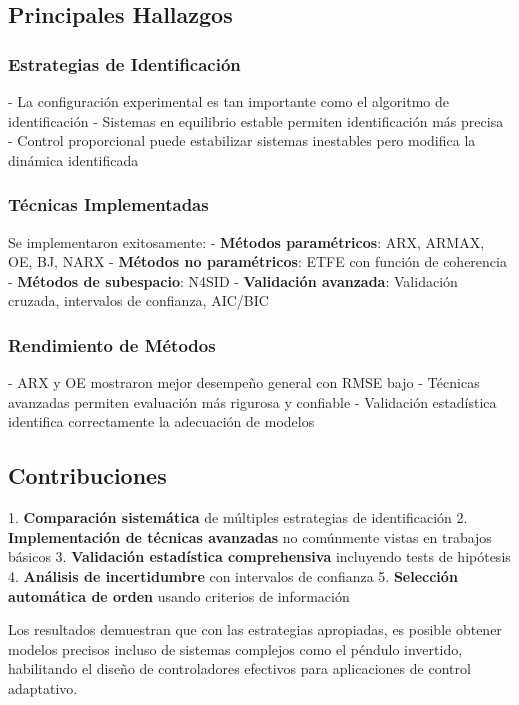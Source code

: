 \documentclass[a4paper,openright,9pt]{report}
\begin{document}
\subsection{Principales Hallazgos}

\subsubsection{Estrategias de Identificación}
- La configuración experimental es tan importante como el algoritmo de identificación
- Sistemas en equilibrio estable permiten identificación más precisa
- Control proporcional puede estabilizar sistemas inestables pero modifica la dinámica identificada

\subsubsection{Técnicas Implementadas}
Se implementaron exitosamente:
- \textbf{Métodos paramétricos}: ARX, ARMAX, OE, BJ, NARX
- \textbf{Métodos no paramétricos}: ETFE con función de coherencia
- \textbf{Métodos de subespacio}: N4SID
- \textbf{Validación avanzada}: Validación cruzada, intervalos de confianza, AIC/BIC

\subsubsection{Rendimiento de Métodos}
- ARX y OE mostraron mejor desempeño general con RMSE bajo
- Técnicas avanzadas permiten evaluación más rigurosa y confiable
- Validación estadística identifica correctamente la adecuación de modelos

\subsection{Contribuciones}

1. \textbf{Comparación sistemática} de múltiples estrategias de identificación
2. \textbf{Implementación de técnicas avanzadas} no comúnmente vistas en trabajos básicos
3. \textbf{Validación estadística comprehensiva} incluyendo tests de hipótesis
4. \textbf{Análisis de incertidumbre} con intervalos de confianza
5. \textbf{Selección automática de orden} usando criterios de información



Los resultados demuestran que con las estrategias apropiadas, es posible obtener modelos precisos incluso de sistemas complejos como el péndulo invertido, habilitando el diseño de controladores efectivos para aplicaciones de control adaptativo.
\end{document}
